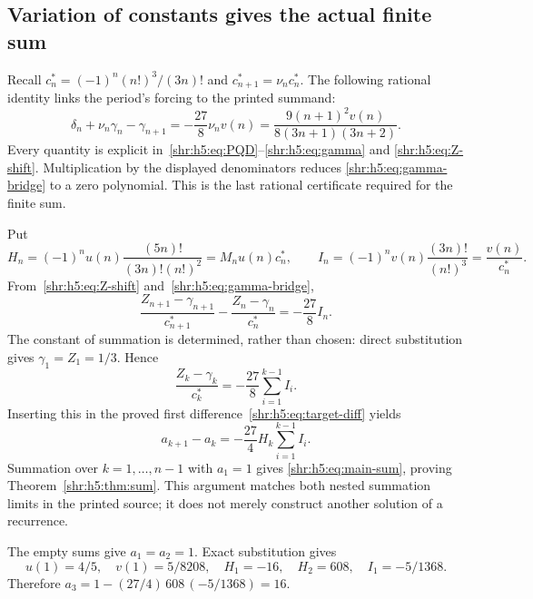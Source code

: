 \documentclass[11pt,letterpaper]{article}
\numberwithin{equation}{section}
\theoremstyle{definition}
\newcommand{\1}{\mathbf 1}
\begin{document}
\subsection{Variation of constants gives the actual finite sum}
Recall $c_n^*=(-1)^n(n!)^3/(3n)!$ and $c_{n+1}^*=\nu_nc_n^*$.
The following rational identity links the period's forcing to the printed
summand:
\begin{equation}
 \delta_n+\nu_n\gamma_n-\gamma_{n+1}
   =-\frac{27}{8}\nu_nv(n)
   =\frac{9(n+1)^2v(n)}{8(3n+1)(3n+2)}.
 \label{shr:h5:eq:gamma-bridge}
\end{equation}
Every quantity is explicit in~\eqref{shr:h5:eq:PQD}--\eqref{shr:h5:eq:gamma} and
\eqref{shr:h5:eq:Z-shift}. Multiplication by the displayed denominators reduces
\eqref{shr:h5:eq:gamma-bridge} to a zero polynomial. This is the last rational
certificate required for the finite sum.

Put
\begin{equation}
 H_n=(-1)^nu(n)\frac{(5n)!}{(3n)!(n!)^2}=M_nu(n)c_n^*,\qquad
 I_n=(-1)^nv(n)\frac{(3n)!}{(n!)^3}=\frac{v(n)}{c_n^*}.
 \label{shr:h5:eq:HI}
\end{equation}
From~\eqref{shr:h5:eq:Z-shift} and~\eqref{shr:h5:eq:gamma-bridge},
\begin{equation}
 \frac{Z_{n+1}-\gamma_{n+1}}{c_{n+1}^*}
   -\frac{Z_n-\gamma_n}{c_n^*}=-\frac{27}{8}I_n.
 \label{shr:h5:eq:normalized-Z-diff}
\end{equation}
The constant of summation is determined, rather than chosen: direct
substitution gives $\gamma_1=Z_1=1/3$. Hence
\[
 \frac{Z_k-\gamma_k}{c_k^*}=-\frac{27}{8}\sum_{i=1}^{k-1}I_i.
\]
Inserting this in the proved first difference~\eqref{shr:h5:eq:target-diff}
yields
\begin{equation}
 a_{k+1}-a_k=-\frac{27}{4}H_k\sum_{i=1}^{k-1}I_i.
 \label{shr:h5:eq:sum-increment}
\end{equation}
Summation over $k=1,\ldots,n-1$ with $a_1=1$ gives
\eqref{shr:h5:eq:main-sum}, proving Theorem~\ref{shr:h5:thm:sum}.
This argument matches both nested summation limits in the printed source;
it does not merely construct another solution of a recurrence.

The empty sums give $a_1=a_2=1$. Exact substitution gives
\begin{equation}
 u(1)=4/5,\quad v(1)=5/8208,\quad
 H_1=-16,\quad H_2=608,\quad I_1=-5/1368.
 \label{shr:h5:eq:initial-constants}
\end{equation}
Therefore $a_3=1-(27/4)\,608\,(-5/1368)=16$.
\end{document}
